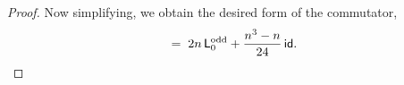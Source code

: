 \documentclass[12pt,oneside,english]{amsart}
\numberwithin{equation}{section}
\numberwithin{figure}{section}
\theoremstyle{plain}
\theoremstyle{plain}
\theoremstyle{plain}
\theoremstyle{plain}
\theoremstyle{remark}
\theoremstyle{definition}
\theoremstyle{plain}
\theoremstyle{plain}
\numberwithin{thm}{section}
\begin{document}
\begin{proof}
Now simplifying, we obtain the desired form of the commutator,
\begin{align*}
[\virL{n}^{\abbrOdd} , \virL{-n}^{\abbrOdd}]
\; = \; 2n \, \virL{0}^{\abbrOdd}
	+ \frac{n^3-n}{24} \, \id.
\end{align*}
\end{proof}
\end{document}
